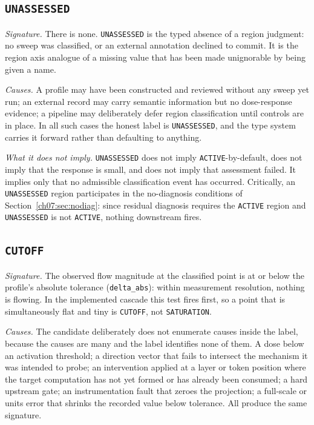 \subsection{\texttt{UNASSESSED}}\label{ch07:sec:region-unassessed}

\emph{Signature.} There is none. \texttt{UNASSESSED} is the typed absence of
a region judgment: no sweep was classified, or an external annotation
declined to commit. It is the region axis analogue of a missing value that
has been made unignorable by being given a name.

\emph{Causes.} A profile may have been constructed and reviewed without any
sweep yet run; an external record may carry semantic information but no
dose-response evidence; a pipeline may deliberately defer region
classification until controls are in place. In all such cases the honest
label is \texttt{UNASSESSED}, and the type system carries it forward rather
than defaulting to anything.

\emph{What it does not imply.} \texttt{UNASSESSED} does not imply
\texttt{ACTIVE}-by-default, does not imply that the response is small, and
does not imply that assessment failed. It implies only that no admissible
classification event has occurred. Critically, an \texttt{UNASSESSED} region
participates in the no-diagnosis conditions of
Section~\ref{ch07:sec:nodiag}: since residual diagnosis requires the
\texttt{ACTIVE} region and \texttt{UNASSESSED} is not \texttt{ACTIVE},
nothing downstream fires.

\subsection{\texttt{CUTOFF}}\label{ch07:sec:region-cutoff}

\emph{Signature.} The observed flow magnitude at the classified point is at
or below the profile's absolute tolerance (\texttt{delta\_abs}): within
measurement resolution, nothing is flowing. In the implemented cascade this
test fires first, so a point that is simultaneously flat and tiny is
\texttt{CUTOFF}, not \texttt{SATURATION}.

\emph{Causes.} The candidate deliberately does not enumerate causes inside
the label, because the causes are many and the label identifies none of them.
A dose below an activation threshold; a direction vector that fails to
intersect the mechanism it was intended to probe; an intervention applied at
a layer or token position where the target computation has not yet formed or
has already been consumed; a hard upstream gate; an instrumentation fault
that zeroes the projection; a full-scale or units error that shrinks the
recorded value below tolerance. All produce the same signature.

